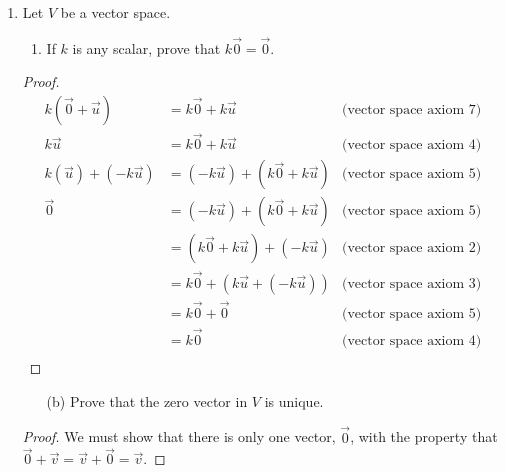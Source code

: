 \documentclass[12pt]{article}
\begin{document}
\begin{enumerate}
\begin{proof}
                      Therefore $W$ is a subspace of $F(-\infty, \infty)$ and hence is a vector space.
              \end{proof}
        \item
              Let $V$ be a vector space.
              \begin{enumerate}
                      \item If $k$ is any scalar, prove that $k\vec{0} = \vec{0}$.
              \end{enumerate}
              \begin{proof}
                      \begin{align*}
                              k(\vec{0} + \vec{u})     & = k\vec{0} + k\vec{u}                 & \textrm{(vector space axiom 7)} \\
                              k\vec{u}                 & = k\vec{0} + k\vec{u}                 & \textrm{(vector space axiom 4)} \\
                              k(\vec{u}) + (-k\vec{u}) & = (-k\vec{u}) + (k\vec{0} + k\vec{u}) & \textrm{(vector space axiom 5)} \\
                              \vec{0}                  & = (-k\vec{u}) + (k\vec{0} + k\vec{u}) & \textrm{(vector space axiom 5)} \\
                                                       & = (k\vec{0} + k\vec{u}) + (-k\vec{u}) & \textrm{(vector space axiom 2)} \\
                                                       & = k\vec{0} + (k\vec{u} + (-k\vec{u})) & \textrm{(vector space axiom 3)} \\
                                                       & = k\vec{0} + \vec{0}                  & \textrm{(vector space axiom 5)} \\
                                                       & = k\vec{0}                            & \textrm{(vector space axiom 4)} \\
                      \end{align*}
              \end{proof}
              \begin{enumerate}
                      \item[(b)] Prove that the zero vector in $V$ is unique.
              \end{enumerate}
              \begin{proof}
                      We must show that there is only one vector, $\vec{0}$, with the property that \\
                      $\vec{0} + \vec{v} = \vec{v} + \vec{0} = \vec{v}$.


\end{proof}
\end{enumerate}
\end{document}
